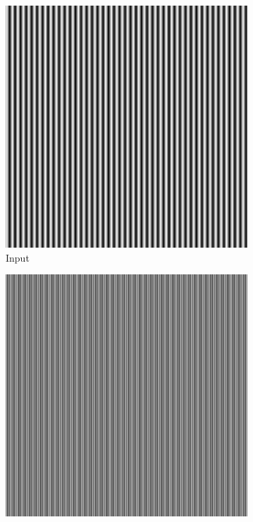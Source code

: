 \documentclass[12pt,a4paper]{article}
\begin{document}
        \begin{figure}[H]
            \centering
            \begin{subfigure}{0.2\textwidth}
                \includegraphics[width=\textwidth]{images/samples/aliasing-2-input.png}
                \caption*{Input}
            \end{subfigure}
            \enspace
            \begin{subfigure}{0.2\textwidth}
                \includegraphics[width=\textwidth]{images/samples/aliasing-2-orig.png}

\end{subfigure}
\end{figure}
\end{document}
